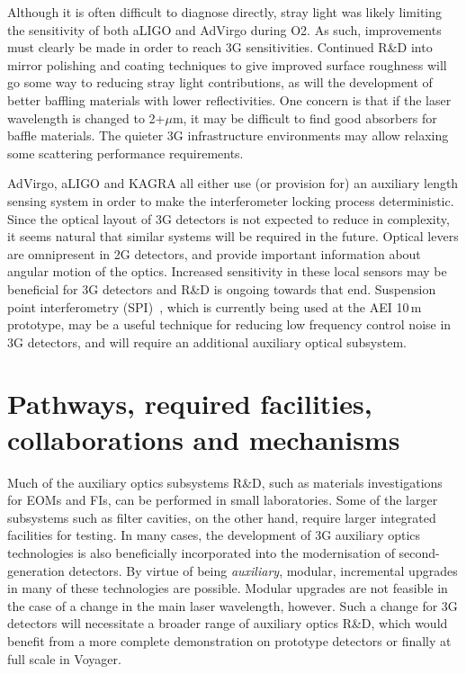 Although it is often difficult to diagnose directly, stray light was likely limiting the sensitivity of both aLIGO and AdVirgo during O2. As such, improvements must clearly be made in order to reach 3G sensitivities. 
Continued R\&D into mirror polishing and coating techniques to give improved surface roughness will go some way to reducing stray light contributions, as will the development of better baffling materials with lower reflectivities. One concern is that if the laser wavelength is changed to 2+$\mu$m, it may be difficult to find good absorbers for baffle materials. The quieter 3G infrastructure environments may allow relaxing some scattering performance requirements.

AdVirgo, aLIGO and KAGRA all either use (or provision for) an auxiliary length sensing system in order to make the interferometer locking process deterministic. Since the optical layout of 3G detectors is not expected to reduce in complexity, it seems natural that similar systems will be required in the future. Optical levers are omnipresent in 2G detectors, and provide important information about angular motion of the optics. Increased sensitivity in these local sensors may be beneficial for 3G detectors
and R\&D is ongoing towards that end. Suspension point interferometry (SPI)~\cite{SPI}, which is currently being used at the AEI 10\,m prototype, may be a useful technique for reducing low frequency control noise in 3G detectors, and will require an additional auxiliary optical subsystem.

\section{Pathways, required facilities, collaborations and mechanisms}

Much of the auxiliary optics subsystems R\&D, such as materials investigations for EOMs and FIs, can be performed in small laboratories. 
Some of the larger subsystems such as filter cavities, on the other hand, require larger integrated facilities for testing. In many cases, the development of 3G auxiliary optics technologies is also beneficially incorporated into the modernisation of second-generation detectors. By virtue of being \emph{auxiliary}, modular, incremental upgrades in many of these technologies are possible. Modular upgrades are not feasible in the case of a change in the main laser wavelength, however. Such a change for 3G detectors will necessitate a broader range of auxiliary optics R\&D, which would benefit from a more complete demonstration on prototype detectors or finally at full scale in Voyager.

